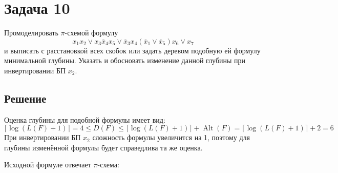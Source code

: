 \documentclass[11pt]{article}
\author{Sergey Makarov}
\date{\today}
\title{}
\newcounter{th}\setcounter{th}{0}
\begin{document}
\section{Задача 10}
\label{sec:org031702f}
Промоделировать \(\pi\)-схемой формулу
\begin{equation*}
x_1x_2\lor x_3\overline{x}_4x_5\lor \overline{x}_3x_4(\overline{x}_1\lor \overline{x}_5)x_6\lor x_7
\end{equation*}
и выписать с расстановкой всех скобок или задать деревом подобную ей формулу минимальной глубины. Указать и обосновать изменение данной глубины при инвертировании БП $x_2$.
\subsection{Решение}
\label{sec:orgadd7fe8}
Оценка глубины для подобной формулы имеет вид:
\begin{equation*}
\lceil\log(L(F) + 1)\rceil = 4 \leq D(F) \leq \lceil\log(L(F) + 1)\rceil + \operatorname{Alt}(F) = \lceil\log(L(F) + 1)\rceil + 2 = 6
\end{equation*}
При инвертировании БП \(x_2\) сложность формулы увеличится на 1, поэтому для глубины изменённой формулы будет справедлива та же оценка.

Исходной формуле отвечает \(\pi\)-схема:
\begin{figure}[H]
\centering
{}
\end{figure}
\newpage
\end{document}
